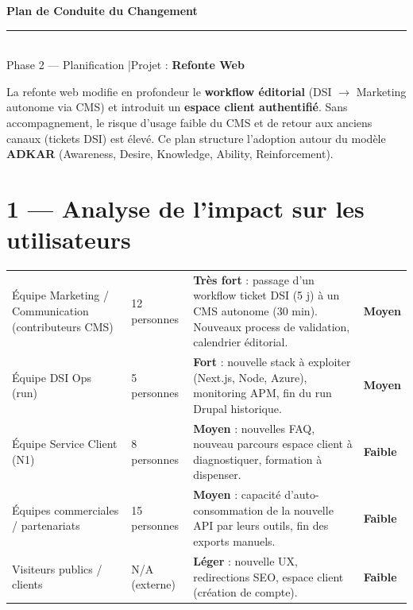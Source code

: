 \documentclass[11pt,a4paper,oneside]{report}
\begin{document}
\small

\begin{center}
{\LARGE\bfseries\color{cnNavy} Plan de Conduite du Changement}\\[4pt]
\textcolor{cnOrange}{\rule{10cm}{1pt}}\\[4pt]
{\large\color{cnSlate} Phase 2 --- Planification \quad|\quad Projet : \textbf{Refonte Web}}
\end{center}

\vspace{6pt}

\begin{decision}
La refonte web modifie en profondeur le \textbf{workflow éditorial} (DSI $\rightarrow$ Marketing autonome via CMS) et introduit un \textbf{espace client authentifié}. Sans accompagnement, le risque d'usage faible du CMS et de retour aux anciens canaux (tickets DSI) est élevé. Ce plan structure l'adoption autour du modèle \textbf{ADKAR} (Awareness, Desire, Knowledge, Ability, Reinforcement).
\end{decision}

\section*{1 --- Analyse de l'impact sur les utilisateurs}

\renewcommand{\arraystretch}{1.4}
\begin{tabularx}{\textwidth}{L{4cm} L{2.5cm} Y C{2cm}}
\toprule
{} &  &  &  \\
\midrule
Équipe Marketing / Communication (contributeurs CMS) & 12 personnes & \textbf{Très fort} : passage d'un workflow ticket DSI (5 j) à un CMS autonome (30 min). Nouveaux process de validation, calendrier éditorial. & \textbf{Moyen} \\
Équipe DSI Ops (run) & 5 personnes & \textbf{Fort} : nouvelle stack à exploiter (Next.js, Node, Azure), monitoring APM, fin du run Drupal historique. & \textbf{Moyen} \\
Équipe Service Client (N1) & 8 personnes & \textbf{Moyen} : nouvelles FAQ, nouveau parcours espace client à diagnostiquer, formation à dispenser. & \textbf{Faible} \\
Équipes commerciales / partenariats & 15 personnes & \textbf{Moyen} : capacité d'auto-consommation de la nouvelle API par leurs outils, fin des exports manuels. & \textbf{Faible} \\
Visiteurs publics / clients & N/A (externe) & \textbf{Léger} : nouvelle UX, redirections SEO, espace client (création de compte). & \textbf{Faible} \\
\bottomrule
\end{tabularx}
\end{document}
